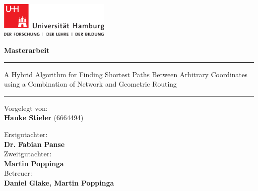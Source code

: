 
\begin{titlepage}
	
	\includegraphics[width=0.4\textwidth]{images/UHH-Logo_2010_Farbe_CMYK.pdf}
	\vspace{1cm}
	
	\begin{center}
		
		{
			\Large
			\textbf{Masterarbeit}
			\par
		}
		
		\vspace{1.5cm}
		\hrule
		\vspace{1cm}
		
		{
			\titlefont
			\huge
			A Hybrid Algorithm for Finding Shortest Paths Between Arbitrary Coordinates using a Combination of Network and Geometric Routing
			\par
		}
		
		\vspace{1cm}
		\hrule
		\vspace{1.5cm}
	\end{center}
	
	\begin{multicols}{2}
		\raggedright
		Vorgelegt von:\\
		\textbf{Hauke Stieler} (6664494)\\
		
		\columnbreak
		\raggedleft
		
		Erstgutachter:\\
		\textbf{Dr. Fabian Panse}\\
		\vspace{0.25cm}
		Zweitgutachter:\\
		\textbf{Martin Poppinga}\\
		\vspace{0.25cm}
		Betreuer:\\
		\textbf{Daniel Glake, Martin Poppinga}
	\end{multicols}

	\vspace{0.5cm}

	\begin{center}
		\vfill
		

\end{center}
\end{titlepage}
